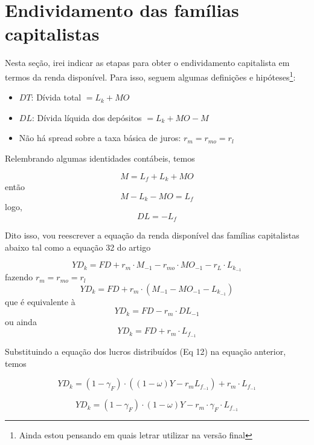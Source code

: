 \documentclass[11pt]{article}
\begin{document}
\section*{Endividamento das famílias capitalistas}
\label{sec:org1d7da5e}

Nesta seção, irei indicar as etapas para obter o endividamento capitalista em termos da renda disponível. Para isso, seguem algumas definições e hipóteses\footnote{Ainda estou pensando em quais letrar utilizar na versão final}:

\begin{itemize}
\item \(DT\): Dívida total \(= L_k + MO\)
\item \(DL\): Dívida líquida dos depósitos \(= L_k + MO - M\)
\item Não há spread sobre a taxa básica de juros: \(r_m = r_{mo} = r_l\)
\end{itemize}

Relembrando algumas identidades contábeis, temos

$$
M = L_f + L_k + MO
$$
então
$$
M - L_k - MO = L_f
$$
logo, 
\begin{equation}
\label{DL}
DL = -L_f
\end{equation}

Dito isso, vou reescrever a equação da renda disponível das famílias capitalistas abaixo tal como a equação 32 do artigo

\begin{equation}
\tag{32}
YD_k = FD + r_m\cdot M_{-1} - r_{mo}\cdot MO_{-1}  - r_{L}\cdot L_{k_{-1}}
\end{equation}
fazendo \(r_m = r_{mo} = r_l\)
\begin{equation}
YD_k = FD + r_m\cdot (M_{-1} - MO_{-1}  - L_{k_{-1}})
\end{equation}
que é equivalente à 
\begin{equation}
YD_k = FD - r_m\cdot DL_{-1}
\end{equation}
ou ainda
\begin{equation}
YD_k = FD + r_m\cdot L_{f_{-1}}
\end{equation}

Substituindo a equação dos lucros distribuídos (Eq 12) na equação anterior, temos

\begin{equation}
YD_k = (1-\gamma_F)\cdot ((1-\omega)Y - r_m L_{f_{-1}}) + r_m\cdot L_{f_{-1}}
\end{equation}

\begin{equation}
\label{New_YD}
YD_k = (1-\gamma_F)\cdot (1-\omega)Y - r_m \cdot \gamma_F \cdot L_{f_{-1}}
\end{equation}
\end{document}
